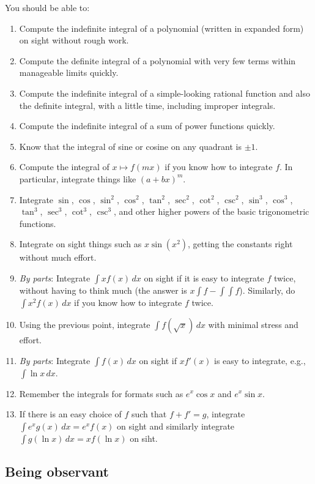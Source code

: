 \documentclass[10pt]{amsart}
\begin{document}
You should be able to:

\begin{enumerate}
\item Compute the indefinite integral of a polynomial (written in
  expanded form) on sight without rough work.
\item Compute the definite integral of a polynomial with very few
  terms within manageable limits quickly.
\item Compute the indefinite integral of a simple-looking rational
  function and also the definite integral, with a little time,
  including improper integrals.
\item Compute the indefinite integral of a sum of power functions
  quickly.
\item Know that the integral of sine or cosine on any quadrant is $\pm
  1$.
\item Compute the integral of $x \mapsto f(mx)$ if you know how to
  integrate $f$. In particular, integrate things like $(a + bx)^m$.
\item Integrate $\sin$, $\cos$, $\sin^2$, $\cos^2$, $\tan^2$,
  $\sec^2$, $\cot^2$, $\csc^2$, $\sin^3$, $\cos^3$, $\tan^3$,
  $\sec^3$, $\cot^3$, $\csc^3$, and other higher powers of the basic
  trigonometric functions.
\item Integrate on sight things such as $x\sin(x^2)$, getting the
  constants right without much effort.
\item {\em By parts}: Integrate $\int xf(x) \, dx$ on sight if it is
  easy to integrate $f$ twice, without having to think much (the
  answer is $x \int f - \int \int f$). Similarly, do $\int x^2f(x) \,
  dx$ if you know how to integrate $f$ twice.
\item Using the previous point, integrate $\int f(\sqrt{x}) \, dx$
  with minimal stress and effort.
\item {\em By parts}: Integrate $\int f(x) \, dx$ on sight if $xf'(x)$
  is easy to integrate, e.g., $\int \ln x \, dx$.
\item Remember the integrals for formats such as $e^x \cos x$ and $e^x
  \sin x$.
\item If there is an easy choice of $f$ such that $f + f' = g$,
  integrate $\int e^xg(x) \, dx = e^xf(x)$ on sight and similarly
  integrate $\int g(\ln x) \, dx = xf(\ln x)$ on siht.
\end{enumerate}
\subsection{Being observant}
\end{document}
